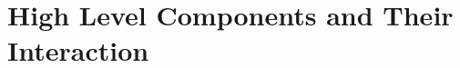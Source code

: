 \documentclass[../../../../dd.tex]{subfiles}
\begin{document}
	\section{High Level Components and Their Interaction}

	
	
\end{document}
